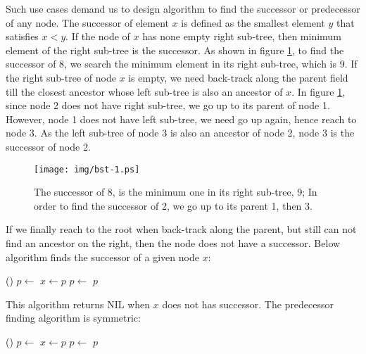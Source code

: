 \documentclass[b5paper]{article}
\begin{document}
Such use cases demand us to design algorithm to find the successor or predecessor of any node. The successor of element $x$ is defined as the smallest element $y$ that satisfies $x < y$. If the node of $x$ has none empty right sub-tree, then minimum element of the right sub-tree is the successor. As shown in figure \ref{fig:bst-succ}, to find the successor of 8, we search the minimum element in its right sub-tree, which is 9. If the right sub-tree of node $x$ is empty, we need back-track along the parent field till the closest ancestor whose left sub-tree is also an ancestor of $x$. In figure \ref{fig:bst-succ}, since node 2 does not have right sub-tree, we go up to its parent of node 1. However, node 1 does not have left sub-tree, we need go up again, hence reach to node 3. As the left sub-tree of node 3 is also an ancestor of node 2, node 3 is the successor of node 2.

\begin{figure}[htbp]
  \centering
  \texttt{[image: img/bst-1.ps]}
  \caption{The successor of 8, is the minimum one in its right sub-tree, 9; In order to find the successor of 2, we go up to its parent 1, then 3. } \label{fig:bst-succ}
\end{figure}

If we finally reach to the root when back-track along the parent, but still can not find an ancestor on the right, then the node does not have a successor. Below algorithm finds the successor of a given node $x$:

\begin{algorithmic}[1]
    \State \Return {}()
  \Else
    \State $p \gets $ 
      \State $x \gets p$
      \State $p \gets $ 
    \EndWhile
    \State \Return $p$
  \EndIf
\EndFunction
\end{algorithmic}

This algorithm returns NIL when $x$ does not has successor. The predecessor finding algorithm is symmetric:

\begin{algorithmic}[1]
    \State \Return {}()
  \Else
    \State $p \gets $ 
      \State $x \gets p$
      \State $p \gets $ 
    \EndWhile
    \State \Return $p$
  \EndIf
\EndFunction
\end{algorithmic}
\end{document}
